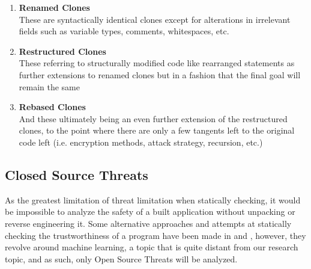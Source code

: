 \begin{enumerate}
    \item \textbf{Renamed Clones} \vspace{0.3cm} \\
    These are syntactically identical clones except for alterations in irrelevant fields such as variable types, comments, whitespaces, etc.
    
    \item \textbf{Restructured Clones} \vspace{0.3cm} \\ 
    These referring to structurally modified code like rearranged statements as further extensions to renamed clones but in a fashion that the final goal will remain the same

    \item \textbf{Rebased Clones} \vspace{0.3cm} \\
    And these ultimately being an even further extension of the restructured clones, to the point where there are only a few tangents left to the original code left (i.e. encryption methods, attack strategy, recursion, etc.)
    
\end{enumerate}


\subsection{Closed Source Threats}


As the greatest limitation of threat limitation when statically checking, it would be impossible to analyze the safety of a built application without unpacking or reverse engineering it. Some alternative approaches and attempts at statically checking the trustworthiness of a program have been made in \cite{nath2014static} and \cite{shalaginov2018machine}, however, they revolve around machine learning, a topic that is quite distant from our research topic, and as such, only Open Source Threats will be analyzed.

